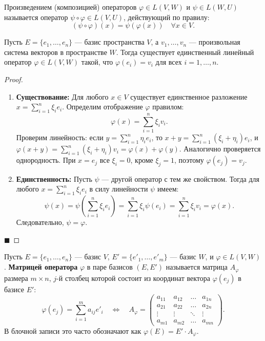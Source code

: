 \begin{definition}
Произведением (композицией) операторов $\varphi \in L(V, W)$ и $\psi \in L(W, U)$ называется оператор $\psi \circ \varphi \in L(V, U)$, действующий по правилу:
\[
(\psi \circ \varphi)(x) = \psi(\varphi(x)) \quad \forall x \in V.
\]
\end{definition}

\begin{theorem}
Пусть $E = \{e_1, \dots, e_n\}$ --- базис пространства $V$, а $v_1, \dots, v_n$ --- произвольная система векторов в пространстве $W$. Тогда существует единственный линейный оператор $\varphi \in L(V, W)$ такой, что $\varphi(e_i) = v_i$ для всех $i = 1, \dots, n$.
\end{theorem}

\begin{proof}
\begin{enumerate}
    \item \textbf{Существование:} Для любого $x \in V$ существует единственное разложение $x = \sum_{i=1}^n \xi_i e_i$. Определим отображение $\varphi$ правилом:
    \[
    \varphi(x) = \sum_{i=1}^n \xi_i v_i.
    \]
    Проверим линейность: если $y = \sum_{i=1}^n \eta_i e_i$, то $x+y = \sum_{i=1}^n (\xi_i + \eta_i) e_i$, и $\varphi(x+y) = \sum_{i=1}^n (\xi_i + \eta_i) v_i = \varphi(x) + \varphi(y)$. Аналогично проверяется однородность. При $x = e_j$ все $\xi_i = 0$, кроме $\xi_j = 1$, поэтому $\varphi(e_j) = v_j$.
    \item \textbf{Единственность:} Пусть $\psi$ --- другой оператор с тем же свойством. Тогда для любого $x = \sum_{i=1}^n \xi_i e_i$ в силу линейности $\psi$ имеем:
    \[
    \psi(x) = \psi\left(\sum_{i=1}^n \xi_i e_i\right) = \sum_{i=1}^n \xi_i \psi(e_i) = \sum_{i=1}^n \xi_i v_i = \varphi(x).
    \]
    Следовательно, $\psi = \varphi$.
\end{enumerate}
\hfill$\blacksquare$
\end{proof}

\begin{definition}
Пусть $E = \{e_1, \dots, e_n\}$ --- базис $V$, $E' = \{e'_1, \dots, e'_m\}$ --- базис $W$, и $\varphi \in L(V, W)$. \textbf{Матрицей оператора} $\varphi$ в паре базисов $(E, E')$ называется матрица $A_\varphi$ размера $m \times n$, $j$-й столбец которой состоит из координат вектора $\varphi(e_j)$ в базисе $E'$:
\[
\varphi(e_j) = \sum_{i=1}^m a_{ij} e'_i \quad \Longleftrightarrow \quad A_\varphi = \begin{pmatrix}
a_{11} & a_{12} & \dots & a_{1n} \\
a_{21} & a_{22} & \dots & a_{2n} \\
\vdots & \vdots & \ddots & \vdots \\
a_{m1} & a_{m2} & \dots & a_{mn}
\end{pmatrix}.
\]
В блочной записи это часто обозначают как $\varphi(E) = E' \cdot A_\varphi$.
\end{definition}

